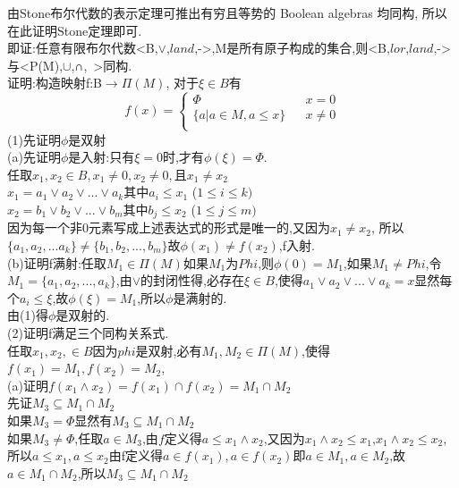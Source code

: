 \documentclass[a4paper, justified]{tufte-handout}
\begin{document}
\begin{solution}
  由Stone布尔代数的表示定理可推出有穷且等势的 Boolean algebras 均同构, 所以在此证明Stone定理即可.\\
  即证:任意有限布尔代数<B,$\lor$,$land$,->,M是所有原子构成的集合,则<B,$lor$,$land$,->与<P(M),$\cup$,∩,~>同构.\\
  证明:构造映射f:B$\rightarrow\Pi (M)$, 对于$\xi \in B$有
  $$ f(x)=\left\{
    \begin{aligned}
      \Phi                           &  & {x = 0}    \\
      \{a | a \in M, a \leqslant x\} &  & {x \neq 0} \\
    \end{aligned}
    \right.
  $$
  (1)先证明$\phi$是双射\\
  (a)先证明$\phi$是入射:只有$\xi = 0$时,才有$\phi(\xi) = \Phi$.\\
  任取$x_1,x_2\in B,x_1 \neq 0, x_2 \neq 0, 且x_1\neq x_2$\\
  $x_1 = a_1 \lor a_2 \lor ... \lor a_k$其中$a_i \leqslant x_1$  ($1 \leqslant i \leqslant k)$\\
  $x_2 = b_1 \lor b_2 \lor ... \lor b_m$其中$b_j \leqslant x_2$  ($1 \leqslant j \leqslant m)$\\
  因为每一个非0元素写成上述表达式的形式是唯一的,又因为$x_1\neq x_2$, 所以$\{a_1, a_2,...a_k\} \neq \{b_1, b_2,...,b_m\}$故$\phi(x_1) \neq f(x_2)$,f入射.\\
  (b)证明f满射:任取$M_1 \in \Pi(M)$如果$M_1$为$Phi$,则$\phi(0) = M_1$,如果$M_1 \neq Phi$,令$M_1 = \{a_1,a_2,...,a_k\}$,由$\lor$的封闭性得,必存在$\xi \in B$,使得$a_1 \lor a_2 \lor ... \lor a_k= x$显然每个$a_i \leqslant \xi$,故$\phi(\xi) = M_1$,所以$\phi$是满射的.\\
  由(1)得$\phi$是双射的.\\
  (2)证明f满足三个同构关系式.\\
  任取$x_1, x_2,\in B$因为$phi$是双射,必有$M_1, M_2 \in \Pi(M)$,使得$f(x_1) = M_1, f(x_2) = M_2$,\\
  (a)证明$f(x_1 \land x_2) = f(x_1) \cap f(x_2) = M_1 \cap M_2$\\
  先证$M_3 \subseteq M_1 \cap M_2$\\
  如果$M_3 = \Phi$显然有$M_3 \subseteq M_1 \cap M_2$\\
  如果$M_3 \neq \Phi$,任取$a \in M_3$,由$f$定义得$a \leqslant x_1 \land x_2$,又因为$x_1 \land x_2 \leqslant x_1$,$x_1 \land x_2 \leqslant x_2$,所以$a \leqslant x_1, a \leqslant x_2$由f定义得$a\in f(x_1), a\in f(x_2)$即$a \in M_1, a\in M_2$,故$a \in M_1 \cap M_2$,所以$M_3 \subseteq M_1 \cap M_2$\\

\end{solution}
\end{document}
